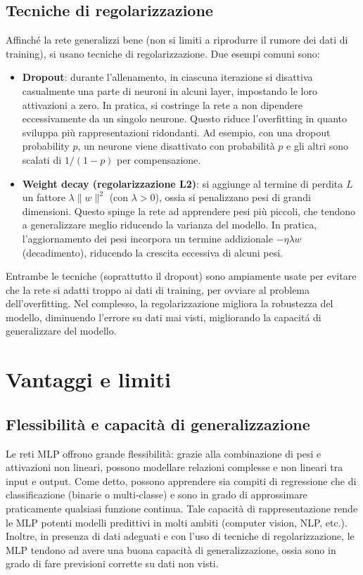 \documentclass[a4paper,12pt]{report}
\begin{document}
	\subsection{Tecniche di regolarizzazione}
	Affinché la rete generalizzi bene (non si limiti a riprodurre il rumore dei dati di training), si usano tecniche di regolarizzazione. Due esempi comuni sono:
	
	\begin{itemize}
		\item \textbf{Dropout}: durante l'allenamento, in ciascuna iterazione si disattiva casualmente una parte di neuroni in alcuni layer, impostando le loro attivazioni a zero. In pratica, si costringe la rete a non dipendere eccessivamente da un singolo neurone. Questo riduce l'overfitting in quanto sviluppa più rappresentazioni ridondanti. Ad esempio, con una dropout probability $p$, un neurone viene disattivato con probabilità $p$ e gli altri sono scalati di $1/(1-p)$ per compensazione.
		\item \textbf{Weight decay (regolarizzazione L2)}: si aggiunge al termine di perdita $L$ un fattore $\lambda \|w\|^2$ (con $\lambda>0$), ossia si penalizzano pesi di grandi dimensioni. Questo spinge la rete ad apprendere pesi più piccoli, che tendono a generalizzare meglio riducendo la varianza del modello. In pratica, l'aggiornamento dei pesi incorpora un termine addizionale $-\eta\lambda w$ (decadimento), riducendo la crescita eccessiva di alcuni pesi.
	\end{itemize}
	Entrambe le tecniche (soprattutto il dropout) sono ampiamente usate per evitare che la rete si adatti troppo ai dati di training, per ovviare al problema dell'overfitting. Nel complesso, la regolarizzazione migliora la robustezza del modello, diminuendo l'errore su dati mai visti, migliorando la capacitá di generalizzare del modello.
	
	\section{Vantaggi e limiti}
	
	\subsection{Flessibilità e capacità di generalizzazione}
	Le reti MLP offrono grande flessibilità: grazie alla combinazione di pesi e attivazioni non lineari, possono modellare relazioni complesse e non lineari tra input e output. Come detto, possono apprendere sia compiti di regressione che di classificazione (binarie o multi-classe) e sono in grado di approssimare praticamente qualsiasi funzione continua. Tale capacità di rappresentazione rende le MLP potenti modelli predittivi in molti ambiti (computer vision, NLP, etc.). Inoltre, in presenza di dati adeguati e con l'uso di tecniche di regolarizzazione, le MLP tendono ad avere una buona capacità di generalizzazione, ossia sono in grado di fare previsioni corrette su dati non visti.
	
\end{document}

